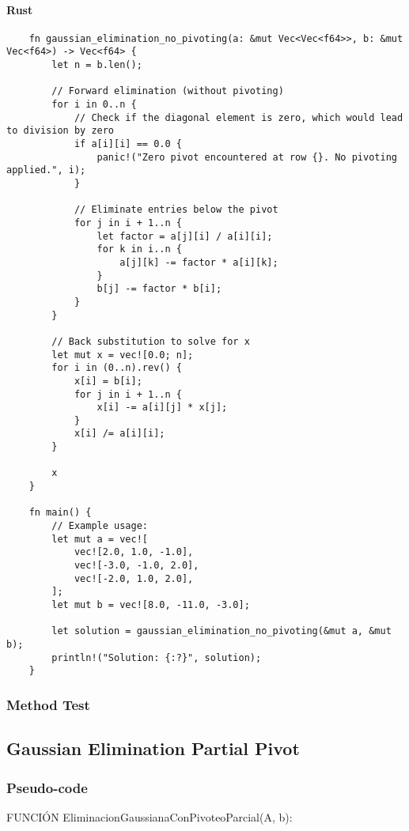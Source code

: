 \documentclass{article}
\begin{document}
            \paragraph{Rust}
                \begin{verbatim}
    fn gaussian_elimination_no_pivoting(a: &mut Vec<Vec<f64>>, b: &mut Vec<f64>) -> Vec<f64> {
        let n = b.len();

        // Forward elimination (without pivoting)
        for i in 0..n {
            // Check if the diagonal element is zero, which would lead to division by zero
            if a[i][i] == 0.0 {
                panic!("Zero pivot encountered at row {}. No pivoting applied.", i);
            }

            // Eliminate entries below the pivot
            for j in i + 1..n {
                let factor = a[j][i] / a[i][i];
                for k in i..n {
                    a[j][k] -= factor * a[i][k];
                }
                b[j] -= factor * b[i];
            }
        }

        // Back substitution to solve for x
        let mut x = vec![0.0; n];
        for i in (0..n).rev() {
            x[i] = b[i];
            for j in i + 1..n {
                x[i] -= a[i][j] * x[j];
            }
            x[i] /= a[i][i];
        }

        x
    }

    fn main() {
        // Example usage:
        let mut a = vec![
            vec![2.0, 1.0, -1.0],
            vec![-3.0, -1.0, 2.0],
            vec![-2.0, 1.0, 2.0],
        ];
        let mut b = vec![8.0, -11.0, -3.0];

        let solution = gaussian_elimination_no_pivoting(&mut a, &mut b);
        println!("Solution: {:?}", solution);
    }

                \end{verbatim}
        \subsubsection{Method Test}

    \subsection{Gaussian Elimination Partial Pivot}
        \subsubsection{Pseudo-code}
        FUNCIÓN EliminacionGaussianaConPivoteoParcial(A, b):
\end{document}

